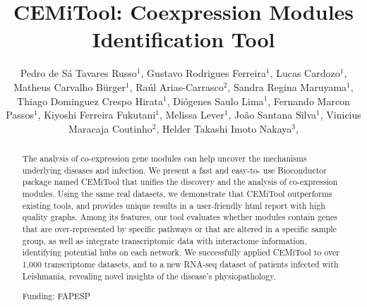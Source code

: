 \documentclass[twoside]{article}
\title{\vspace{-15mm}\fontsize{24pt}{10pt}\selectfont\textbf{ CEMiTool: Coexpression Modules Identification Tool }} %
\author{ Pedro de Sá Tavares Russo$^{1}$, Gustavo Rodrigues Ferreira$^{1}$, Lucas Cardozo$^{1}$, Matheus Carvalho Bürger$^{1}$, Raúl Arias-Carrasco$^{2}$, Sandra Regina Maruyama$^{1}$, Thiago Dominguez Crespo Hirata$^{1}$, Diógenes Saulo Lima$^{1}$, Fernando Marcon Passos$^{1}$, Kiyoshi Ferreira Fukutani$^{1}$, Melissa Lever$^{1}$, João Santana Silva$^{1}$, Vinicius Maracaja Coutinho$^{2}$, Helder Takashi Imoto Nakaya$^{3}$, }
\affil{ 1 Universidade de São Paulo

2 Universidad Mayor

3 University of Sao Paulo

 }
\date{}
\begin{document}
  
  
  \maketitle %
  
  
  \thispagestyle{fancy} %
  
  
  \begin{abstract}
  The analysis of co-expression gene modules can help uncover the mechanisms underlying
diseases and infection. We present a fast and easy-to- use Bioconductor package named
CEMiTool that unifies the discovery and the analysis of co-expression modules. Using the
same real datasets, we demonstrate that CEMiTool outperforms existing tools, and provides
unique results in a user-friendly html report with high quality graphs. Among its features, our
tool evaluates whether modules contain genes that are over-represented by specific pathways
or that are altered in a specific sample group, as well as integrate transcriptomic data with
interactome information, identifying potential hubs on each network. We successfully
applied CEMiTool to over 1,000 transcriptome datasets, and to a new RNA-seq dataset of
patients infected with Leishmania, revealing novel insights of the disease’s physiopathology.
  
  Funding: FAPESP \\ 
  \end{abstract}
  
\end{document}
